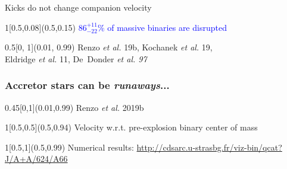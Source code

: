 \documentclass[xcolor=dvipsnames,professionalfonts, aspectratio=169]{beamer}
\begin{document}
\begin{frame}{Kicks do not change companion velocity}
  \begin{textblock}{1}[0.5,0.08](0.5,0.15)
    \centering\Large \textcolor{Blue}{{\Huge $86^{+11}_{-22}\%$} of massive binaries are
      disrupted}
  \end{textblock}

  \begin{textblock}{0.5}[0, 1](0.01, 0.99)
    \textcolor{gray!50}{\tiny Renzo \emph{et al.} 19b, Kochanek
      \emph{et al.} 19,\\[-7pt]
      Eldridge \emph{et al.} 11,
    De~Donder \emph{et al. 97}}
\end{textblock}
\end{frame}




\begin{frame}
  \frametitle{Accretor stars can be \emph{runaways}...}
  \centering

  \begin{textblock}{0.45}[0,1](0.01,0.99)
    \textcolor{gray!50}{\tiny Renzo \emph{et al.} 2019b}\hfill\,
  \end{textblock}

  \begin{textblock}{1}[0.5,0.5](0.5,0.94)
    \textcolor{gray!50}{Velocity w.r.t. pre-explosion binary center of mass}
  \end{textblock}

  \begin{textblock}{1}[0.5,1](0.5,0.99)
    \centering
    \textcolor{gray!50}{\tiny Numerical results:   \href{http://cdsarc.u-strasbg.fr/viz-bin/qcat?J/A+A/624/A66}{http://cdsarc.u-strasbg.fr/viz-bin/qcat?J/A+A/624/A66}}
  \end{textblock}
\end{frame}
\end{document}
